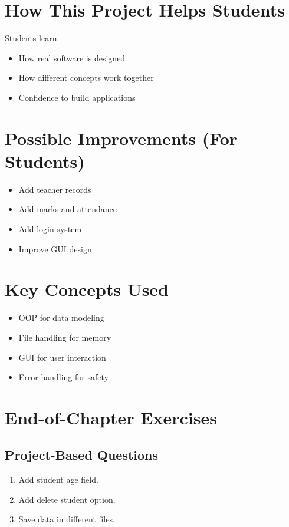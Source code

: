 \section{How This Project Helps Students}

Students learn:
\begin{itemize}
    \item How real software is designed
    \item How different concepts work together
    \item Confidence to build applications
\end{itemize}

\section{Possible Improvements (For Students)}

\begin{itemize}
    \item Add teacher records
    \item Add marks and attendance
    \item Add login system
    \item Improve GUI design
\end{itemize}

\section{Key Concepts Used}

\begin{itemize}
    \item OOP for data modeling
    \item File handling for memory
    \item GUI for user interaction
    \item Error handling for safety
\end{itemize}

\section{End-of-Chapter Exercises}

\subsection{Project-Based Questions}

\begin{enumerate}
    \item Add student age field.
    \item Add delete student option.
    \item Save data in different files.
\end{enumerate}

